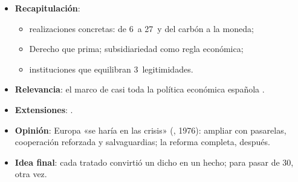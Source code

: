 \documentclass{article}
\begin{document}
\begin{columnas}
\begin{itemize}
\item \textbf{Recapitulación}:
  \begin{itemize}
  \item realizaciones concretas: de 6~a 27~y del carbón a la moneda;
  \item Derecho que prima; subsidiariedad como regla económica;
  \item instituciones que equilibran 3~legitimidades.
  \end{itemize}
\item \textbf{Relevancia}: el marco de casi toda la política económica española .
\item \textbf{Extensiones}:     .
\item \textbf{Opinión}: Europa «se haría en las crisis» (, 1976): ampliar con pasarelas, cooperación reforzada y salvaguardias; la reforma completa, después.
\item \textbf{Idea final}: cada tratado convirtió un dicho en un hecho; para pasar de 30, otra vez.
\end{itemize}


\end{columnas}
\end{document}
